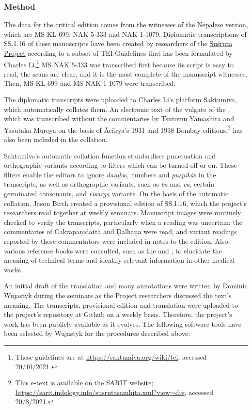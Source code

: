 \subsubsection{Method}
The data for the critical edition comes from the witnesses of the Nepalese version, which are MS KL 699, NAK 5-333 and NAK 1-1079. Diplomatic transcriptions of SS.1.16 of these manuscripts have been created by researchers of the \href{https://sushrutaproject.org}{Suśruta Project}\space%
according to a subset of TEI Guidelines that has been formulated by Charles Li.\footnote{These guidelines are at \url{https://saktumiva.org/wiki/tei}, accessed 20/10/2021.} MS NAK 5-333 was transcribed first because its script is easy to read, the scans are clear, and it is the most complete of the manuscript witnesses. Then, MS KL 699 and MS NAK 1-1079 were transcribed. 

The diplomatic transcripts were uploaded to Charles Li's platform Saktumiva, which automatically collates them. An electronic text of the vulgate of the \SS, which was transcribed without the commentaries by Tsutomu Yamashita and Yasutaka Muroya on the basis of Ācārya's 1931 and 1938 Bombay editions,\footnote{This e-text is available on the SARIT website; \url{https://sarit.indology.info/susrutasamhita.xml?view=div}, accessed 20/8/2021.} has also been included in the collation. 

Saktumiva's automatic collation function standardises punctuation and orthographic variants according to filters which can be turned off or on. These filters enable the editors to ignore \emph{daṇḍa}s, numbers and \emph{puṣpikā}s in the transcripts, as well as orthographic variants, such as \emph{ba} and \emph{va}, certain germinated consonants, and \emph{visarga} variants. On the basis of the automatic collation, Jason Birch created a provisional edition of SS.1.16, which the project's researchers read together at weekly seminars. Manuscript images were routinely checked to verify the transcripts, particularly when a reading was uncertain; the commentaries of Cakrapāṇidatta and Ḍalhaṇa were read, and variant readings reported by these commentators were included in notes to the edition. Also, various reference books were consulted, such as the  \citet{josi-maha,nadk-1954} and \citet{meul-hist}, to elucidate the meaning of technical terms and identify relevant information in other medical works. 

An initial draft of the translation and many annotations were written by Dominic Wujastyk during the seminars as the Project researchers discussed the text's meaning. The transcripts, provisional edition and translation were uploaded to the project's repository at Github on a weekly basis. Therefore, the project's work has been publicly available as it evolves. The following software tools have been selected by Wujastyk for the procedures described above: 

